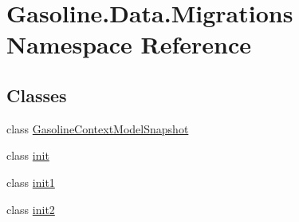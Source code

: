 \hypertarget{namespace_gasoline_1_1_data_1_1_migrations}{}\section{Gasoline.\+Data.\+Migrations Namespace Reference}
\label{namespace_gasoline_1_1_data_1_1_migrations}
\subsection*{Classes}
\begin{DoxyCompactItemize}
\item 
class \mbox{\hyperlink{class_gasoline_1_1_data_1_1_migrations_1_1_gasoline_context_model_snapshot}{Gasoline\+Context\+Model\+Snapshot}}
\item 
class \mbox{\hyperlink{class_gasoline_1_1_data_1_1_migrations_1_1init}{init}}
\item 
class \mbox{\hyperlink{class_gasoline_1_1_data_1_1_migrations_1_1init1}{init1}}
\item 
class \mbox{\hyperlink{class_gasoline_1_1_data_1_1_migrations_1_1init2}{init2}}
\end{DoxyCompactItemize}
